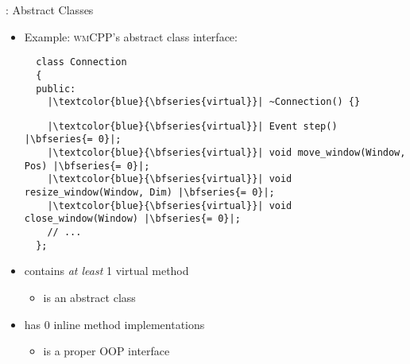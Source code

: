 \begin{frame}[fragile]{\underline{\cpp}: Abstract Classes \hfill {\footnotesize \currentname}}


    \begin{itemize}

        \item Example: \textsc{wmCPP}'s  abstract class interface:\\[3pt]
\begin{verbatim}
  class Connection
  {
  public:
    |\textcolor{blue}{\bfseries{virtual}}| ~Connection() {}
\end{verbatim}
\begin{verbatim}
    |\textcolor{blue}{\bfseries{virtual}}| Event step() |\bfseries{= 0}|;
    |\textcolor{blue}{\bfseries{virtual}}| void move_window(Window, Pos) |\bfseries{= 0}|;
    |\textcolor{blue}{\bfseries{virtual}}| void resize_window(Window, Dim) |\bfseries{= 0}|;
    |\textcolor{blue}{\bfseries{virtual}}| void close_window(Window) |\bfseries{= 0}|;
    // ...
  };
\end{verbatim}

        \item {} contains \textit{at least} 1 virtual method
            \begin{itemize}
                \item {} is an abstract class
            \end{itemize}

        \item {} has 0 inline method implementations
            \begin{itemize}
                \item {} is a proper OOP interface
            \end{itemize}

    \end{itemize}

    \vfill

\end{frame}

